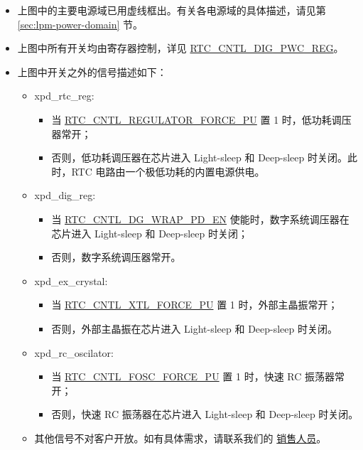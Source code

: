 \documentclass[main\_\_CN.tex]{subfiles}
\begin{document}
\begin{tiplisting}
\begin{itemize}
\vspace{-3em}
    \item 上图中的主要电源域已用虚线框出。有关各电源域的具体描述，请见第 \ref{sec:lpm-power-domain} 节。
    \item 上图中所有开关均由寄存器控制，详见 \hyperref[regdesc:RTCCNTLDIGPWCREG]{RTC\_CNTL\_DIG\_PWC\_REG}。
    \item 上图中开关之外的信号描述如下：
    \begin{itemize}
        \item xpd\_rtc\_reg:
        \begin{itemize}
            \item 当 \hyperref[fielddesc:RTCCNTLREGULATORFORCEPU]{RTC\_CNTL\_REGULATOR\_FORCE\_PU} 置 1 时，低功耗调压器常开；
            \item 否则，低功耗调压器在芯片进入 Light-sleep 和 Deep-sleep 时关闭。此时，RTC 电路由一个极低功耗的内置电源供电。
        \end{itemize}
        \item xpd\_dig\_reg: \label{step:lpm-signal-dig-reg}
        \begin{itemize}
            \item 当 \hyperref[fielddesc:RTCCNTLDGWRAPPDEN]{RTC\_CNTL\_DG\_WRAP\_PD\_EN} 使能时，数字系统调压器在芯片进入 Light-sleep 和 Deep-sleep 时关闭；
            \item 否则，数字系统调压器常开。
        \end{itemize}
        \item xpd\_ex\_crystal:
        \begin{itemize}
            \item 当 \hyperref[fielddesc:RTCCNTLXTLFORCEPU]{RTC\_CNTL\_XTL\_FORCE\_PU} 置 1 时，外部主晶振常开；
            \item 否则，外部主晶振在芯片进入 Light-sleep 和 Deep-sleep 时关闭。
        \end{itemize}
        \item xpd\_rc\_oscilator:
        \begin{itemize}
            \item 当 \hyperref[fielddesc:RTCCNTLFOSCFORCEPU]{RTC\_CNTL\_FOSC\_FORCE\_PU} 置 1 时，快速 RC 振荡器常开；
            \item 否则，快速 RC 振荡器在芯片进入 Light-sleep 和 Deep-sleep 时关闭。
        \end{itemize}
        \item 其他信号不对客户开放。如有具体需求，请联系我们的 \href{https://www.espressif.com/en/contact-us/technical-inquiries}{销售人员}。
    \end{itemize}
\end{itemize}
\end{tiplisting}
\end{document}
